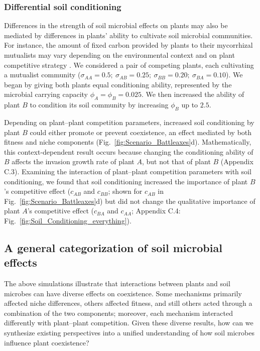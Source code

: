 \subsubsection*{Differential soil conditioning}
Differences in the strength of soil microbial effects on plants may also be mediated by differences in plants' ability to cultivate soil microbial communities. For instance, the amount of fixed carbon provided by plants to their mycorrhizal mutualists may vary depending on the environmental context \citep{Zheng2015, Norby1987} and on plant competitive strategy \citep{Hoeksema2010}. We considered a pair of competing plants, each cultivating a mutualist community ($\sigma_{AA} = 0.5;\ \sigma_{AB} = 0.25;\ \sigma_{BB} = 0.20;\ \sigma_{BA} = 0.10$). We began by giving both plants equal conditioning ability, represented by the microbial carrying capacity $\phi_{A} = \phi_{B} = 0.025$. We then increased the ability of plant $B$ to condition its soil community by increasing $\phi_{B}$ up to $2.5$.
\par


Depending on plant--plant competition parameters, increased soil conditioning by plant $B$ could either promote or prevent coexistence, an effect mediated by both fitness and niche components (Fig.~\ref{fig:Scenario_Battleaxes}d). Mathematically, this context-dependent result occurs because changing the conditioning ability of $B$ affects the invasion growth rate of plant $A$, but not that of plant $B$ (Appendix C.3). Examining the interaction of plant--plant competition parameters with soil conditioning, we found that soil conditioning increased the importance of plant $B$'s competitive effect ($c_{AB}$ and $c_{BB}$; shown for $c_{AB}$ in Fig.~\ref{fig:Scenario_Battleaxes}d) but did not change the qualitative importance of plant $A$'s competitive effect ($c_{BA}$ and $c_{AA}$; Appendix C.4: Fig.~\ref{fig:Soil_Conditioning_everything}).
\par



\subsection{A general categorization of soil microbial effects}
The above simulations illustrate that interactions between plants and soil microbes can have diverse effects on coexistence. Some mechanisms primarily affected niche differences, others affected fitness, and still others acted through a combination of the two components; moreover, each mechanism interacted differently with plant--plant competition.
Given these diverse results, how can we synthesize existing perspectives into a unified understanding of how soil microbes influence plant coexistence?
\par


